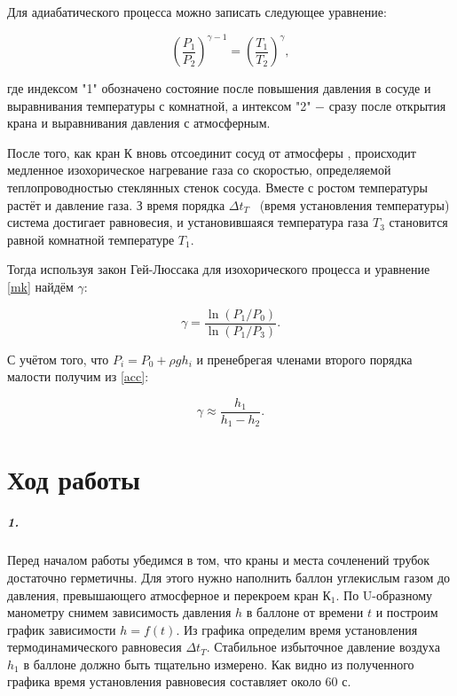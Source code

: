 \documentclass[a4paper,12pt]{article}
\begin{document}
Для адиабатического процесса можно записать следующее уравнение: 

\begin{equation}\label{mk}
\left(\dfrac{P_1}{P_2}\right)^{\gamma - 1} = \left(\dfrac{T_1}{T_2}\right)^\gamma , 
\end{equation} 

где индексом "1" обозначено состояние после повышения давления в сосуде и выравнивания температуры с комнатной, а интексом "2"  $-$ сразу после открытия крана и выравнивания давления с атмосферным. 

После того, как кран К вновь отсоединит сосуд от атмосферы , происходит медленное изохорическое нагревание газа со скоростью, определяемой теплопроводностью стеклянных стенок сосуда. Вместе с ростом температуры растёт и давление газа. З время порядка $\Delta t_T$  (время установления температуры) система достигает равновесия, и установившаяся температура газа $T_3$ становится равной комнатной температуре $T_1$. 

Тогда используя закон Гей-Люссака для изохорического процесса и уравнение \eqref{mk} найдём $\gamma$:

\begin{equation}\label{acc}
\gamma = \dfrac{\ln(P_1 / P_0)}{\ln (P_1 / P_3)}.
\end{equation}

С учётом того, что $P_i = P_0 + \rho g h_i$ и пренебрегая членами второго порядка малости получим из \eqref{acc}:

\begin{equation}\label{r}
\gamma \approx \dfrac{h_1}{h_1 - h_2}.
\end{equation}


\newpage

\section*{Ход работы}

\subparagraph*{1.} Перед началом работы убедимся в том, что краны и места сочленений трубок достаточно герметичны. Для этого нужно наполнить баллон углекислым газом до давления, превышающего атмосферное  и перекроем кран $К_1$. По  U-образному манометру снимем зависимость давления $h$ в баллоне от времени $t$ и построим график зависимости $h = f(t)$. Из графика определим время установления термодинамического равновесия $\Delta t_T$. Стабильное избыточное давление воздуха $h_1$ в баллоне должно быть тщательно измерено. Как видно из полученного графика время установления равновесия составляет около 60 с. 
\end{document}
